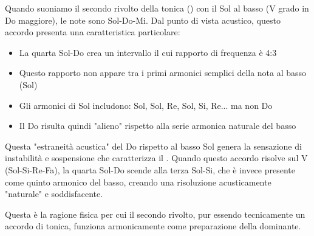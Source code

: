 \begin{fisica}
	Quando suoniamo il secondo rivolto della tonica () con il Sol al basso (V grado in Do maggiore), le note sono Sol-Do-Mi. Dal punto di vista acustico, questo accordo presenta una caratteristica particolare:
	
	\begin{itemize}
		\item La quarta Sol-Do crea un intervallo il cui rapporto di frequenza è 4:3
		\item Questo rapporto non appare tra i primi armonici semplici della nota al basso (Sol)
		\item Gli armonici di Sol includono: Sol, Sol, Re, Sol, Si, Re... ma non Do
		\item Il Do risulta quindi "alieno" rispetto alla serie armonica naturale del basso
	\end{itemize}
	
	Questa "estraneità acustica" del Do rispetto al basso Sol genera la sensazione di instabilità e sospensione che caratterizza il . Quando questo accordo risolve sul V (Sol-Si-Re-Fa), la quarta Sol-Do scende alla terza Sol-Si, che è invece presente come quinto armonico del basso, creando una risoluzione acusticamente "naturale" e soddisfacente.
	
	Questa è la ragione fisica per cui il secondo rivolto, pur essendo tecnicamente un accordo di tonica, funziona armonicamente come preparazione della dominante.
\end{fisica}

